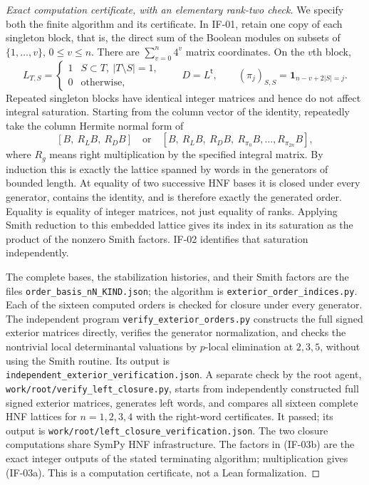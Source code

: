 \begin{proof}[Exact computation certificate, with an elementary rank-two check]
We specify both the finite algorithm and its certificate. In IF-01,
retain one copy of each singleton block, that is, the direct sum of the
Boolean modules on subsets of $\{1,\ldots,v\}$, $0\leq v\leq n$.
There are $\sum_{v=0}^n4^v$ matrix coordinates. On the $v$th block,
\[
 L_{T,S}=\begin{cases}1&S\subset T,\ |T\setminus S|=1,\\0&\text{otherwise},\end{cases}
 \qquad D=L^{\mathsf t},\qquad
 (\pi_j)_{S,S}=\boldsymbol1_{n-v+2|S|=j}.
\]
Repeated singleton blocks have identical integer matrices and hence do
not affect integral saturation. Starting from the column vector of the
identity, repeatedly take the column Hermite normal form of
\[
 [B,\ R_LB,\ R_DB]
 \quad\text{or}\quad
 [B,\ R_LB,\ R_DB,\ R_{\pi_0}B,\ldots,R_{\pi_{2n}}B],
\]
where $R_g$ means right multiplication by the specified integral matrix.
By induction this is exactly the lattice spanned by words in the
generators of bounded length. At equality of two successive HNF bases
it is closed under every generator, contains the identity, and is
therefore exactly the generated order. Equality is equality of integer
matrices, not just equality of ranks. Applying Smith reduction to this
embedded lattice gives its index in its saturation as the product of the
nonzero Smith factors. IF-02 identifies that saturation independently.

The complete bases, the stabilization histories, and their Smith factors
are the files \texttt{order\_basis\_nN\_KIND.json}; the algorithm is
\texttt{exterior\_order\_indices.py}. Each of the sixteen computed orders
is checked for closure under every generator. The independent program
\texttt{verify\_exterior\_orders.py} constructs the full signed exterior
matrices directly, verifies the generator normalization, and checks the
nontrivial local determinantal valuations by $p$-local elimination at
$2,3,5$, without using the Smith routine. Its output is
\texttt{independent\_exterior\_verification.json}. A separate check
by the root agent, \texttt{work/root/verify\_left\_closure.py},
starts from independently constructed full signed exterior matrices,
generates left words, and compares all sixteen complete HNF lattices
for $n=1,2,3,4$ with the right-word certificates. It passed; its
output is \texttt{work/root/left\_closure\_verification.json}. The
two closure computations share SymPy HNF infrastructure. The factors in
(IF-03b) are the exact integer outputs of the stated terminating
algorithm; multiplication gives (IF-03a). This is a computation
certificate, not a Lean formalization.


\end{proof}
